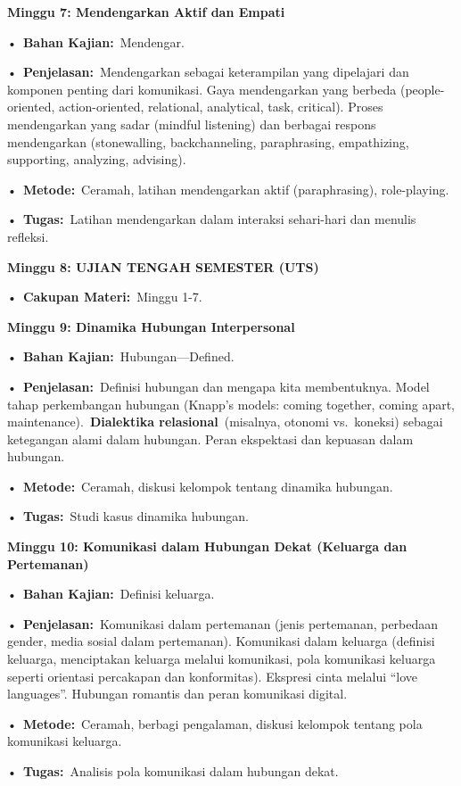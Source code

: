 \documentclass[
  letterpaper,
  DIV=11,
  numbers=noendperiod]{scrreprt}
\begin{document}
\textbf{Minggu 7: Mendengarkan Aktif dan Empati}

•~\textbf{Bahan Kajian:}~Mendengar.

•~\textbf{Penjelasan:}~Mendengarkan sebagai keterampilan yang dipelajari
dan komponen penting dari komunikasi. Gaya mendengarkan yang berbeda
(people-oriented, action-oriented, relational, analytical, task,
critical). Proses mendengarkan yang sadar (mindful listening) dan
berbagai respons mendengarkan (stonewalling, backchanneling,
paraphrasing, empathizing, supporting, analyzing, advising).

•~\textbf{Metode:}~Ceramah, latihan mendengarkan aktif (paraphrasing),
role-playing.

•~\textbf{Tugas:}~Latihan mendengarkan dalam interaksi sehari-hari dan
menulis refleksi.

\textbf{Minggu 8: UJIAN TENGAH SEMESTER (UTS)}

•~\textbf{Cakupan Materi:}~Minggu 1-7.

\textbf{Minggu 9: Dinamika Hubungan Interpersonal}

•~\textbf{Bahan Kajian:}~Hubungan---Defined.

•~\textbf{Penjelasan:}~Definisi hubungan dan mengapa kita membentuknya.
Model tahap perkembangan hubungan (Knapp's models: coming together,
coming apart, maintenance).~\textbf{Dialektika relasional}~(misalnya,
otonomi vs.~koneksi) sebagai ketegangan alami dalam hubungan. Peran
ekspektasi dan kepuasan dalam hubungan.

•~\textbf{Metode:}~Ceramah, diskusi kelompok tentang dinamika hubungan.

•~\textbf{Tugas:}~Studi kasus dinamika hubungan.

\textbf{Minggu 10: Komunikasi dalam Hubungan Dekat (Keluarga dan
Pertemanan)}

•~\textbf{Bahan Kajian:}~Definisi keluarga.

•~\textbf{Penjelasan:}~Komunikasi dalam pertemanan (jenis pertemanan,
perbedaan gender, media sosial dalam pertemanan). Komunikasi dalam
keluarga (definisi keluarga, menciptakan keluarga melalui komunikasi,
pola komunikasi keluarga seperti orientasi percakapan dan konformitas).
Ekspresi cinta melalui ``love languages''. Hubungan romantis dan peran
komunikasi digital.

•~\textbf{Metode:}~Ceramah, berbagi pengalaman, diskusi kelompok tentang
pola komunikasi keluarga.

•~\textbf{Tugas:}~Analisis pola komunikasi dalam hubungan dekat.
\end{document}

